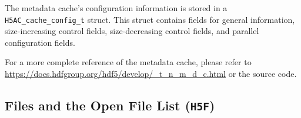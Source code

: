 The metadata cache's configuration information is stored in a \texttt{H5AC\_cache\_config\_t} struct. This struct contains fields for general information, size-increasing control fields, size-decreasing control fields, and parallel configuration fields. 

For a more complete reference of the metadata cache, please refer to \url{https://docs.hdfgroup.org/hdf5/develop/_t_n_m_d_c.html} or the source code.

\subsection{Files and the Open File List (\texttt{H5F})}



